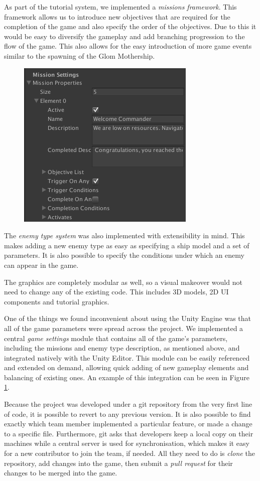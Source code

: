 \documentclass[a4paper,11pt]{article}
\begin{document}
As part of the tutorial system, we implemented a \emph{missions framework}. This framework allows us to introduce new objectives that are required for the completion of the game and also specify the order of the objectives. Due to this it would be easy to diversify the gameplay and add branching progression to the flow of the game. This also allows for the easy introduction of more game events similar to the spawning of the Glom Mothership.

\begin{figure}
	\centering
	\includegraphics[width=.32\textwidth]{modular_missions}
    \label{fig:modular_missions}
    \vspace{-2em}
\end{figure}

The \emph{enemy type system} was also implemented with extensibility in mind. This makes adding a new enemy type as easy as specifying a ship model and a set of parameters. It is also possible to specify the conditions under which an enemy can appear in the game.

The graphics are completely modular as well, so a visual makeover would not need to change any of the existing code. This includes 3D models, 2D UI components and tutorial graphics.

One of the things we found inconvenient about using the Unity Engine was that all of the game parameters were spread across the project. We implemented a central \emph{game settings} module that contains all of the game's parameters, including the missions and enemy type description, as mentioned above, and integrated natively with the Unity Editor. This module can be easily referenced and extended on demand, allowing quick adding of new gameplay elements and balancing of existing ones. An example of this integration can be seen in Figure \ref{fig:modular_missions}.


Because the project was developed under a git repository from the very first line of code, it is possible to revert to any previous version. It is also possible to find exactly which team member implemented a particular feature, or made a change to a specific file. Furthermore, git asks that developers keep a local copy on their machines while a central server is used for synchronisation, which makes it easy for a new contributor to join the team, if needed. All they need to do is \emph{clone} the repository, add changes into the game, then submit a \emph{pull request} for their changes to be merged into the game.
\end{document}
